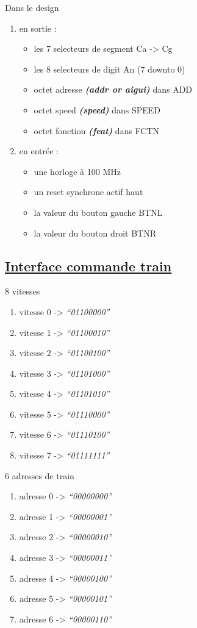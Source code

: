 \hrulefill

Dans le design
\begin{enumerate}
\item en sortie :
  \begin{itemize}  
  \item les 7 selecteurs de segment Ca -> Cg
  \item les 8 selecteurs de digit   An (7 downto 0)
  \item octet adresse \textbf{\emph{(addr or aigui)}}  dans ADD
  \item octet speed \textbf{\emph{(speed)}}  dans SPEED
  \item octet fonction \textbf{\emph{(feat)}}  dans FCTN    
  \end{itemize}  
\item en entrée :
  \begin{itemize}  
  \item une horloge à 100 MHz
  \item un reset synchrone actif haut 
  \item la valeur du bouton gauche BTNL
  \item la valeur du bouton droit BTNR    
  \end{itemize}  
\end{enumerate}

\subsection{\underline{Interface commande train}}
\label{sec:ihm-train}

\bigskip

8 vitesses
\begin {enumerate}
\item vitesse 0 -> \emph{``01100000''}
\item vitesse 1 -> \emph{``01100010''}
\item vitesse 2 -> \emph{``01100100''}
\item vitesse 3 -> \emph{``01101000''}
\item vitesse 4 -> \emph{``01101010''}
\item vitesse 5 -> \emph{``01110000''}
\item vitesse 6 -> \emph{``01110100''}
\item vitesse 7 -> \emph{``01111111''}
\end {enumerate}  

\bigskip

6 adresses de train
\begin {enumerate}
\item adresse 0 -> \emph{``00000000''}  
\item adresse 1 -> \emph{``00000001''}
\item adresse 2 -> \emph{``00000010''}
\item adresse 3 -> \emph{``00000011''}
\item adresse 4 -> \emph{``00000100''}
\item adresse 5 -> \emph{``00000101''}
\item adresse 6 -> \emph{``00000110''}
\end {enumerate}  

